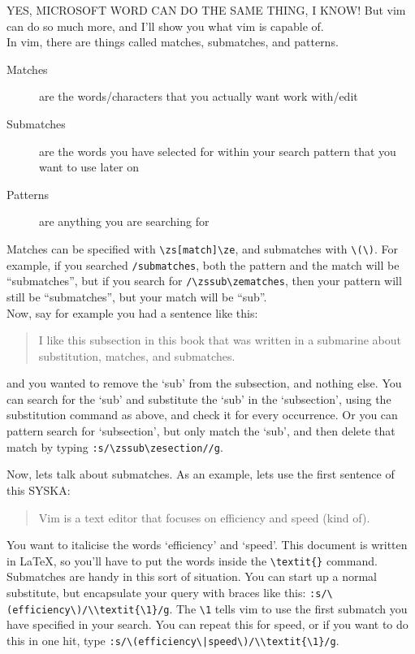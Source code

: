 \documentclass[a4paper, 12pt]{article}
\begin{document}
YES, MICROSOFT WORD CAN DO THE SAME THING, I KNOW!
But vim can do so much more, and I'll show you what vim is capable of.\\

In vim, there are things called matches, submatches, and patterns.
\begin{description}
\item[Matches] are the words/characters that you actually want work with/edit
\item[Submatches] are the words you have selected for within your search pattern that you want to use later on
\item[Patterns] are anything you are searching for
\end{description}

Matches can be specified with \verb|\zs[match]\ze|, and submatches with \verb|\(\)|.
For example, if you searched \verb!/submatches!, both the pattern and the match will be ``submatches'', but if you search for \verb!/\zssub\zematches!, then your pattern will still be ``submatches'', but your match will be ``sub''.\\

Now, say for example you had a sentence like this:
\begin{quote}




I like this subsection in this book that was written in a submarine about substitution, matches, and submatches.




\end{quote}
and you wanted to remove the `sub' from the subsection, and nothing else.
You can search for the `sub' and substitute the `sub' in the `subsection', using the substitution command as above, and check it for every occurrence.
Or you can pattern search for `subsection', but only match the `sub', and then delete that match by typing \verb!:s/\zssub\zesection//g!.

Now, lets talk about submatches.
As an example, lets use the first sentence of this SYSKA:
\begin{quote}




Vim is a text editor that focuses on efficiency and speed (kind of).




\end{quote}
You want to italicise the words `efficiency' and `speed'.
This document is written in \LaTeX{}, so you'll have to put the words inside the \verb!\textit{}! command.
Submatches are handy in this sort of situation.
You can start up a normal substitute, but encapsulate your query with braces like this: \verb!:s/\(efficiency\)/\\textit{\1}/g!.
The \verb!\1! tells vim to use the first submatch you have specified in your search.
You can repeat this for speed, or if you want to do this in one hit, type \verb!:s/\(efficiency\|speed\)/\\textit{\1}/g!.\\
\end{document}
